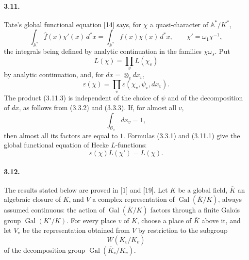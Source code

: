 \documentclass[10pt]{article}
\newcommand{\Gal}{\operatorname{Gal}}
\begin{document}
\paragraph{3.11.} Tate's global functional equation [14] says, for \(\chi\) a quasi-character of \(\mathbb A^*/K^*\),
\[
\tag{3.11.1}
\int_{\mathbb A^*}\widehat f(x)\chi'(x)\,d^*x
=
\int_{\mathbb A^*}f(x)\chi(x)\,d^*x,
\qquad
\chi'=\omega_1\chi^{-1},
\]
the integrals being defined by analytic continuation in the families \(\chi\omega_s\). Put
\[
\tag{3.11.2}
L(\chi)=\prod_vL(\chi_v)
\]
by analytic continuation, and, for \(dx=\otimes_vdx_v\),
\[
\tag{3.11.3}
\varepsilon(\chi)=\prod_v\varepsilon(\chi_v,\psi_v,dx_v).
\]
The product (3.11.3) is independent of the choice of \(\psi\) and of the decomposition of \(dx\), as follows from (3.3.2) and (3.3.3). If, for almost all \(v\),
\[
\int_{\mathcal O_v}dx_v=1,
\]
then almost all its factors are equal to \(1\). Formulas (3.3.1) and (3.11.1) give the global functional equation of Hecke \(L\)-functions:
\[
\tag{3.11.4}
\varepsilon(\chi)L(\chi')=L(\chi).
\]

\paragraph{3.12.} The results stated below are proved in [1] and [19]. Let \(K\) be a global field, \(\overline K\) an algebraic closure of \(K\), and \(V\) a complex representation of \(\Gal(\overline K/K)\), always assumed continuous: the action of \(\Gal(\overline K/K)\) factors through a finite Galois group \(\Gal(K'/K)\). For every place \(v\) of \(K\), choose a place of \(\overline K\) above it, and let \(V_v\) be the representation obtained from \(V\) by restriction to the subgroup
\[
W(\overline K_v/K_v)
\]
of the decomposition group \(\Gal(\overline K_v/K_v)\).
\end{document}
